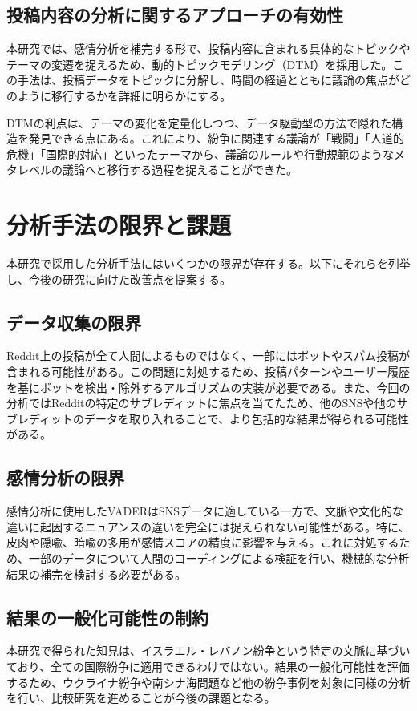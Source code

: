 \documentclass[11pt, a4j]{jreport}
\begin{document}
    \subsection{投稿内容の分析に関するアプローチの有効性}
    本研究では、感情分析を補完する形で、投稿内容に含まれる具体的なトピックやテーマの変遷を捉えるため、動的トピックモデリング（DTM）を採用した。この手法は、投稿データをトピックに分解し、時間の経過とともに議論の焦点がどのように移行するかを詳細に明らかにする。

    DTMの利点は、テーマの変化を定量化しつつ、データ駆動型の方法で隠れた構造を発見できる点にある。これにより、紛争に関連する議論が「戦闘」「人道的危機」「国際的対応」といったテーマから、議論のルールや行動規範のようなメタレベルの議論へと移行する過程を捉えることができた。

    \section{分析手法の限界と課題}
    本研究で採用した分析手法にはいくつかの限界が存在する。以下にそれらを列挙し、今後の研究に向けた改善点を提案する。

    \subsection{データ収集の限界}
    Reddit上の投稿が全て人間によるものではなく、一部にはボットやスパム投稿が含まれる可能性がある。この問題に対処するため、投稿パターンやユーザー履歴を基にボットを検出・除外するアルゴリズムの実装が必要である。また、今回の分析ではRedditの特定のサブレディットに焦点を当てたため、他のSNSや他のサブレディットのデータを取り入れることで、より包括的な結果が得られる可能性がある。

    \subsection{感情分析の限界}
    感情分析に使用したVADERはSNSデータに適している一方で、文脈や文化的な違いに起因するニュアンスの違いを完全には捉えられない可能性がある。特に、皮肉や隠喩、暗喩の多用が感情スコアの精度に影響を与える。これに対処するため、一部のデータについて人間のコーディングによる検証を行い、機械的な分析結果の補完を検討する必要がある。

    \subsection{結果の一般化可能性の制約}
    本研究で得られた知見は、イスラエル・レバノン紛争という特定の文脈に基づいており、全ての国際紛争に適用できるわけではない。結果の一般化可能性を評価するため、ウクライナ紛争や南シナ海問題など他の紛争事例を対象に同様の分析を行い、比較研究を進めることが今後の課題となる。
\end{document}
